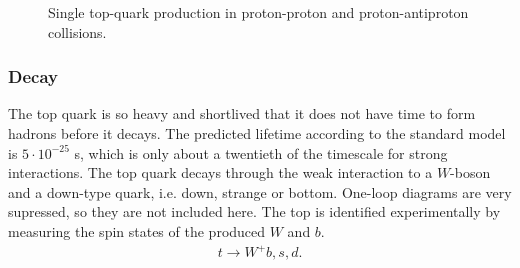 \documentclass[11pt]{article}
\begin{document}
\begin{multicols}{2}
\begin{flushleft}
\begin{figure}[H]
\caption{Single top-quark production in proton-proton and proton-antiproton collisions.}
\label{fig:: single top}
\end{figure}
\end{flushleft}


\subsubsection*{Decay}

\begin{flushleft}
The top quark is so heavy and shortlived that it does not have time to form hadrons before it decays. The predicted lifetime according to the standard model is $5 \cdot 10^{-25}$ s, which is only about a twentieth of the timescale for strong interactions. The top quark decays through the weak interaction to a $W$-boson and a down-type quark, i.e. down, strange or bottom. One-loop diagrams are very supressed, so they are not included here. The top is identified experimentally by measuring the spin states of the produced $W$ and $b$.
\begin{align*}
t \rightarrow W^+ b,s,d.
\end{align*}


\end{flushleft}
\end{multicols}
\end{document}

